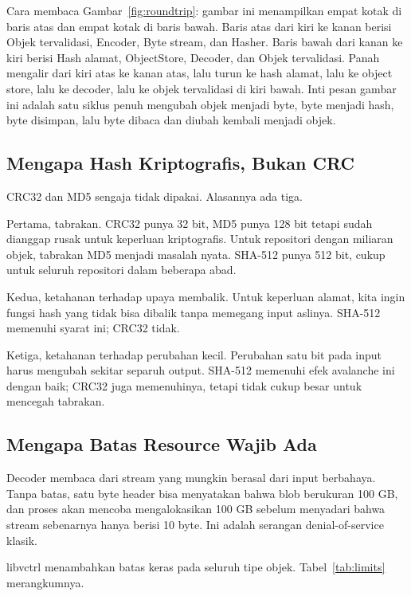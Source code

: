 \documentclass[11pt,a4paper]{article}
\begin{document}
Cara membaca Gambar~\ref{fig:roundtrip}: gambar ini menampilkan empat kotak di baris atas dan empat kotak di baris bawah. Baris atas dari kiri ke kanan berisi Objek tervalidasi, Encoder, Byte stream, dan Hasher. Baris bawah dari kanan ke kiri berisi Hash alamat, ObjectStore, Decoder, dan Objek tervalidasi. Panah mengalir dari kiri atas ke kanan atas, lalu turun ke hash alamat, lalu ke object store, lalu ke decoder, lalu ke objek tervalidasi di kiri bawah. Inti pesan gambar ini adalah satu siklus penuh mengubah objek menjadi byte, byte menjadi hash, byte disimpan, lalu byte dibaca dan diubah kembali menjadi objek.

\subsection{Mengapa Hash Kriptografis, Bukan CRC}

CRC32 dan MD5 sengaja tidak dipakai. Alasannya ada tiga.

Pertama, tabrakan. CRC32 punya 32 bit, MD5 punya 128 bit tetapi sudah dianggap rusak untuk keperluan kriptografis. Untuk repositori dengan miliaran objek, tabrakan MD5 menjadi masalah nyata. SHA-512 punya 512 bit, cukup untuk seluruh repositori dalam beberapa abad.

Kedua, ketahanan terhadap upaya membalik. Untuk keperluan alamat, kita ingin fungsi hash yang tidak bisa dibalik tanpa memegang input aslinya. SHA-512 memenuhi syarat ini; CRC32 tidak.

Ketiga, ketahanan terhadap perubahan kecil. Perubahan satu bit pada input harus mengubah sekitar separuh output. SHA-512 memenuhi efek avalanche ini dengan baik; CRC32 juga memenuhinya, tetapi tidak cukup besar untuk mencegah tabrakan.

\subsection{Mengapa Batas Resource Wajib Ada}

Decoder membaca dari stream yang mungkin berasal dari input berbahaya. Tanpa batas, satu byte header bisa menyatakan bahwa blob berukuran 100 GB, dan proses akan mencoba mengalokasikan 100 GB sebelum menyadari bahwa stream sebenarnya hanya berisi 10 byte. Ini adalah serangan denial-of-service klasik.

libvctrl menambahkan batas keras pada seluruh tipe objek. Tabel~\ref{tab:limits} merangkumnya.
\end{document}

